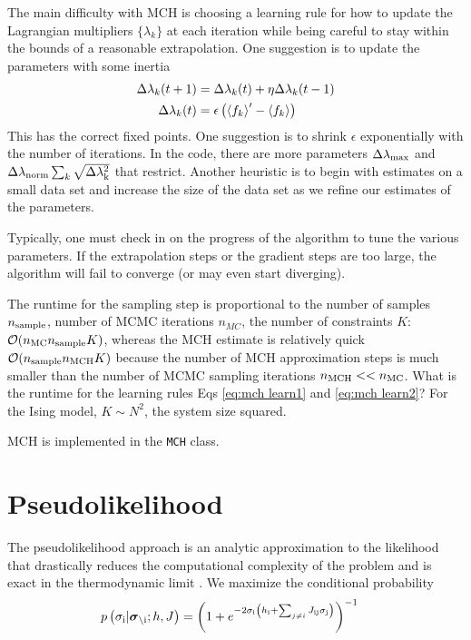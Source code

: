 \documentclass[aps,prl,twocolumn]{revtex4-1}
\begin{document}
The main difficulty with MCH is choosing a learning rule for how to update the Lagrangian multipliers $\{\lambda_k\}$ at each iteration while being careful to stay within the bounds of a reasonable extrapolation. One suggestion is to update the parameters with some inertia
\begin{align}
	\Delta\lambda_k(t+1) &= \Delta \lambda_k(t) + \eta \Delta\lambda_k(t-1)\label{eq:mch learn1}\\
	\Delta \lambda_k(t) &= \epsilon\left(\left<f_k\right>'-\left<f_k\right>\right)\label{eq:mch learn2}
\end{align}
This has the correct fixed points. One suggestion is to shrink $\epsilon$ exponentially with the number of iterations. In the code, there are more parameters $\Delta\lambda_{\rm max}$ and $\Delta\lambda_{\rm norm}\sum_k \sqrt{\Delta\lambda_{\rm k}^2}$ that restrict. Another heuristic is to begin with estimates on a small data set and increase the size of the data set as we refine our estimates of the parameters.

Typically, one must check in on the progress of the algorithm to tune the various parameters. If the extrapolation steps or the gradient steps are too large, the algorithm will fail to converge (or may even start diverging).

The runtime for the sampling step is proportional to the number of samples $n_{\rm sample}$, number of MCMC iterations $n_{MC}$, the number of constraints $K$:
$\mathcal{O}(n_{\rm MC} n_{\rm sample} K)$, whereas the MCH estimate is relatively quick $\mathcal{O}(n_{\rm sample}n_{\rm MCH}K)$ because the number of MCH approximation steps is much smaller than the number of MCMC sampling iterations $n_{\rm MCH}<<n_{\rm MC}$. What is the runtime for the learning rules Eqs \ref{eq:mch learn1} and \ref{eq:mch learn2}?
For the Ising model, $K\sim N^2$, the system size squared.

MCH is implemented in the {\tt MCH} class.

\section{Pseudolikelihood}
The pseudolikelihood approach is an analytic approximation to the likelihood that drastically reduces the computational complexity of the problem and is exact in the thermodynamic limit \cite{Aurell:2012hi}. We maximize the conditional probability 
\begin{align}
	p\left(\sigma_{\rm i}|\boldsymbol{\sigma}_{\backslash \rm i};h,J\right) &= \left( 1+e^{-2\sigma_{\rm i} \left(h_{\rm i}+\sum_{j\neq i}J_{\rm ij}\sigma_{\rm j}\right)} \right)^{-1}
\end{align}
\end{document}
